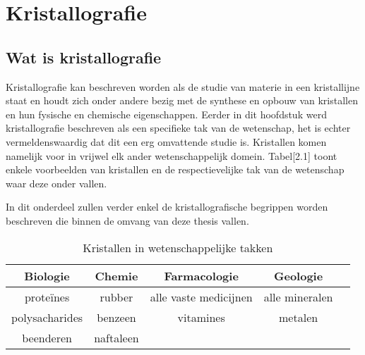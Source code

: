 \section{Kristallografie}

\subsection{Wat is kristallografie}
Kristallografie kan beschreven worden als de studie van materie in een kristallijne staat en houdt zich onder andere bezig met de synthese en opbouw van kristallen en hun fysische en chemische eigenschappen. Eerder in dit hoofdstuk werd kristallografie beschreven als een specifieke tak van de wetenschap, het is echter vermeldenswaardig dat dit een erg omvattende studie is. Kristallen komen namelijk voor in vrijwel elk ander wetenschappelijk domein. Tabel[2.1] toont enkele voorbeelden van kristallen en de respectievelijke tak van de wetenschap waar deze onder vallen.
\par
In dit onderdeel zullen verder enkel de kristallografische begrippen worden beschreven die binnen de omvang van deze thesis vallen.  
\par
\begin{table}
\caption{Kristallen in wetenschappelijke takken}
\begin{tabular}{@{}ccccl@{}}
\toprule
\multicolumn{1}{c}{\textbf{Biologie}} & \multicolumn{1}{c}{\textbf{Chemie}} & \multicolumn{1}{c}{\textbf{Farmacologie}} & \multicolumn{1}{c}{\textbf{Geologie}} &  \\ \midrule
proteïnes                              & rubber                               & alle vaste medicijnen                      & alle mineralen                         &  \\
polysacharides                         & benzeen                              & vitamines                                  & metalen                                &  \\
beenderen                              & naftaleen                            &                                            &                                        &  \\ \bottomrule
\end{tabular}
\end{table}

